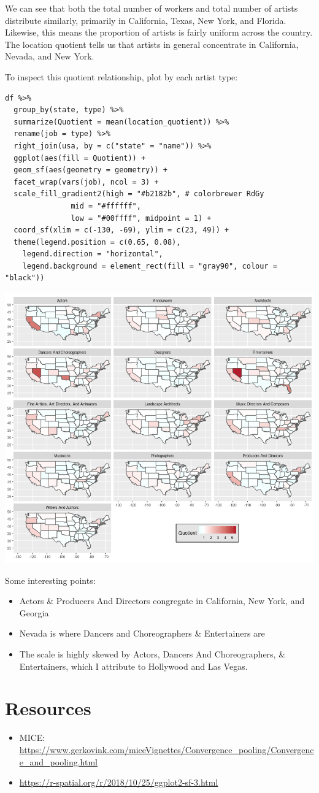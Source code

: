 \documentclass[8pt]{article}
\begin{document}
We can see that both the total number of workers and total number of artists distribute similarly, primarily in California, Texas, New York, and Florida. Likewise, this means the proportion of artists is fairly uniform across the country. The location quotient tells us that artists in general concentrate in California, Nevada, and New York.

To inspect this quotient relationship, plot by each artist type:

\begin{verbatim}
df %>%
  group_by(state, type) %>%
  summarize(Quotient = mean(location_quotient)) %>%
  rename(job = type) %>%
  right_join(usa, by = c("state" = "name")) %>%
  ggplot(aes(fill = Quotient)) +
  geom_sf(aes(geometry = geometry)) +
  facet_wrap(vars(job), ncol = 3) +
  scale_fill_gradient2(high = "#b2182b", # colorbrewer RdGy
		       mid = "#ffffff",
		       low = "#00ffff", midpoint = 1) +
  coord_sf(xlim = c(-130, -69), ylim = c(23, 49)) +
  theme(legend.position = c(0.65, 0.08),
	legend.direction = "horizontal",
	legend.background = element_rect(fill = "gray90", colour = "black"))
\end{verbatim}

\begin{center}
\includegraphics[width=.9\linewidth]{media/gis_quot.png}
\end{center}

Some interesting points:
\begin{itemize}
\item Actors \& Producers And Directors congregate in California, New York, and Georgia
\item Nevada is where Dancers and Choreographers \& Entertainers are
\item The scale is highly skewed by Actors, Dancers And Choreographers, \& Entertainers, which I attribute to Hollywood and Las Vegas.
\end{itemize}

\begin{latex}
\pagebreak
\end{latex}
\section{Resources}
\label{sec:org2b46d5c}
\begin{itemize}
\item MICE: \url{https://www.gerkovink.com/miceVignettes/Convergence\_pooling/Convergence\_and\_pooling.html}
\item \url{https://r-spatial.org/r/2018/10/25/ggplot2-sf-3.html}
\end{itemize}
\end{document}
